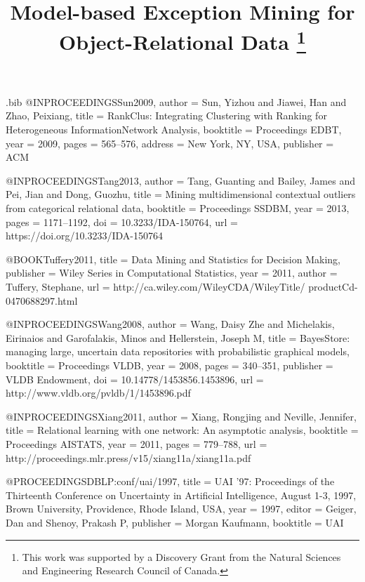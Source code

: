 {\begin{filecontents}{\jobname.bib}
@INPROCEEDINGS{Sun2009,
  author = {Sun, Yizhou and Jiawei, Han and Zhao, Peixiang},
  title = {RankClus: Integrating Clustering with Ranking for Heterogeneous
	InformationNetwork Analysis},
  booktitle = {Proceedings EDBT},
  year = {2009},
  pages = {565--576},
  address = {New York, NY, USA},
  publisher = {ACM}
}

@INPROCEEDINGS{Tang2013,
  author = {Tang, Guanting and Bailey, James and Pei, Jian and Dong, Guozhu},
  title = {Mining multidimensional contextual outliers from categorical relational
	data},
  booktitle = {Proceedings SSDBM},
  year = {2013},
  pages = {1171--1192},
  doi = {10.3233/IDA-150764},
  url = {https://doi.org/10.3233/IDA-150764}
}

@BOOK{Tuffery2011,
  title = {Data Mining and Statistics for Decision Making},
  publisher = {Wiley Series in Computational Statistics},
  year = {2011},
  author = {Tuffery, Stephane},
  url = {http://ca.wiley.com/WileyCDA/WileyTitle/ productCd-0470688297.html}
}

@INPROCEEDINGS{Wang2008,
  author = {Wang, Daisy Zhe and Michelakis, Eirinaios and Garofalakis, Minos
	and Hellerstein, Joseph M},
  title = {BayesStore: managing large, uncertain data repositories with probabilistic
	graphical models},
  booktitle = {Proceedings VLDB},
  year = {2008},
  pages = {340--351},
  publisher = {VLDB Endowment},
  doi = {10.14778/1453856.1453896},
  url = {http://www.vldb.org/pvldb/1/1453896.pdf}
}

@INPROCEEDINGS{Xiang2011,
  author = {Xiang, Rongjing and Neville, Jennifer},
  title = {Relational learning with one network: An asymptotic analysis},
  booktitle = {Proceedings AISTATS},
  year = {2011},
  pages = {779--788},
  url = {http://proceedings.mlr.press/v15/xiang11a/xiang11a.pdf}
}

@PROCEEDINGS{DBLP:conf/uai/1997,
  title = {UAI '97: Proceedings of the Thirteenth Conference on Uncertainty
	in Artificial Intelligence, August 1-3, 1997, Brown University, Providence,
	Rhode Island, USA},
  year = {1997},
  editor = {Geiger, Dan and Shenoy, Prakash P},
  publisher = {Morgan Kaufmann},
  booktitle = {UAI}
}


\end{filecontents}



\title{Model-based Exception Mining for Object-Relational Data
\thanks{This work was supported by a Discovery Grant from the Natural Sciences and Engineering Research Council of Canada.}
}

}
